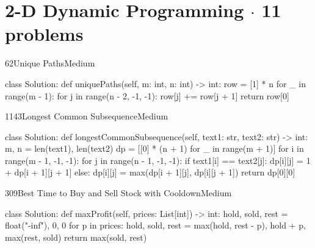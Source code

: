 \section{2-D Dynamic Programming {\normalsize\color{muted}$\cdot$ 11 problems}}

\begin{problem}{62}{Unique Paths}{Medium}
\begin{code}
class Solution:
    def uniquePaths(self, m: int, n: int) -> int:
        row = [1] * n
        for _ in range(m - 1):
            for j in range(n - 2, -1, -1):
                row[j] += row[j + 1]
        return row[0]
\end{code}
\end{problem}

\begin{problem}{1143}{Longest Common Subsequence}{Medium}
\begin{code}
class Solution:
    def longestCommonSubsequence(self, text1: str, text2: str) -> int:
        m, n = len(text1), len(text2)
        dp = [[0] * (n + 1) for _ in range(m + 1)]
        for i in range(m - 1, -1, -1):
            for j in range(n - 1, -1, -1):
                if text1[i] == text2[j]:
                    dp[i][j] = 1 + dp[i + 1][j + 1]
                else:
                    dp[i][j] = max(dp[i + 1][j], dp[i][j + 1])
        return dp[0][0]
\end{code}
\end{problem}

\begin{problem}{309}{Best Time to Buy and Sell Stock with Cooldown}{Medium}
\begin{code}
class Solution:
    def maxProfit(self, prices: List[int]) -> int:
        hold, sold, rest = float("-inf"), 0, 0
        for p in prices:
            hold, sold, rest = max(hold, rest - p), hold + p, max(rest, sold)
        return max(sold, rest)
\end{code}
\end{problem}

